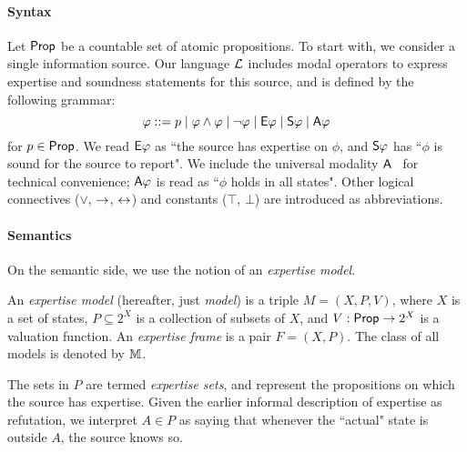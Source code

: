 \paragraph{Syntax}

Let $\Prop$ be a countable set of atomic propositions.
%
To start with, we consider a single information source. Our language $\cL$
includes modal operators to express expertise and soundness statements for this
source, and is defined by the following grammar:
\[
\phi ::=
 p \mid
 \phi \land \phi \mid
 \neg\phi \mid
 \E\phi \mid
 \S\phi \mid
 \A\phi
\]
for $p \in \Prop$. We read $\E\phi$ as ``the source has expertise on
$\phi$, and $\S\phi$ has ``$\phi$ is sound for the source to
report". We include the universal modality $\A$~\cite{goranko_1992}
for technical convenience; $\A\phi$ is read as ``$\phi$ holds in all
states".  Other logical connectives ($\lor$, $\limplies$,
$\liff$) and constants ($\top$, $\bot$) are introduced as
abbreviations.

\paragraph{Semantics}

On the semantic side, we use the notion of an \emph{expertise model}.

\begin{definition}
    \label{exp_def_expertise_model}

    An \emph{expertise model} (hereafter, just \emph{model})
    is a triple $M = (X, P, V)$, where $X$ is a set
    of states, $P \subseteq 2^X$ is a collection of subsets of $X$, and $V:
    \Prop \to 2^X$ is a valuation function. An \emph{expertise frame} is a pair
    $F = (X, P)$.  The class of all models is denoted by $\M$.

\end{definition}

The sets in $P$ are termed \emph{expertise sets}, and represent the
propositions on which the source has expertise. Given the earlier informal
description of expertise as refutation, we interpret $A \in P$ as saying
that whenever the ``actual" state is outside $A$, the source knows so.

